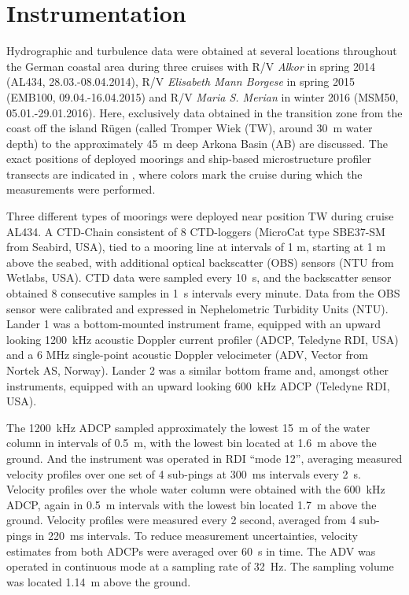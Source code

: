 \section{Instrumentation}

Hydrographic and turbulence data were obtained at several locations throughout 
the 
German coastal area during three cruises with R/V \textit{Alkor} in spring 2014 
(AL434, 28.03.-08.04.2014), R/V \textit{Elisabeth Mann Borgese} in spring 2015 
(EMB100, 09.04.-16.04.2015) and R/V \textit{Maria S. Merian} in winter 2016 
(MSM50, 05.01.-29.01.2016). Here, exclusively data obtained in the 
transition zone from the coast off 
the island R\"{u}gen (called Tromper Wiek (TW), around 30~m water depth) to 
the approximately 45~m deep Arkona Basin (AB) are discussed. The exact 
positions of deployed 
moorings and ship-based microstructure profiler transects are indicated in 
, where colors mark the cruise during which the measurements 
were performed.

Three different types of moorings were deployed near position TW during cruise 
AL434. A CTD-Chain consistent of 8 CTD-loggers (MicroCat type SBE37-SM from 
Seabird, USA), tied to a mooring line at intervals of 1 m, starting at 1 m above 
the seabed, with additional optical backscatter (OBS) sensors (NTU from 
Wetlabs, USA). CTD data were sampled every 10~s, and the backscatter sensor 
obtained 8 consecutive samples in 1~s intervals every minute. Data from the OBS 
sensor were calibrated and expressed in Nephelometric Turbidity Units (NTU).
Lander 1 was a bottom-mounted instrument frame, equipped with an upward looking 
1200~kHz acoustic Doppler current profiler (ADCP, Teledyne RDI, USA) and a 6 
MHz single-point acoustic Doppler velocimeter (ADV, Vector from Nortek AS, 
Norway).
Lander 2 was a similar bottom frame and, amongst other instruments, equipped 
with an upward looking 600~kHz ADCP (Teledyne RDI, USA).

The 1200~kHz ADCP sampled approximately the lowest 15~m of the water column in 
intervals of 0.5~m, with the lowest bin located at 1.6~m above the ground. 
And the instrument was operated in RDI ``mode 12'', 
averaging measured velocity profiles over one set of 4 sub-pings at 300~ms 
intervals every 2~s. 
Velocity profiles over the whole water column were 
obtained with the 600~kHz ADCP, again in 0.5~m intervals with the lowest bin 
located 1.7~m above the ground. Velocity profiles were measured every 2 second, 
averaged from 4 sub-pings in 220~ms intervals. To reduce measurement 
uncertainties, velocity estimates from both ADCPs were averaged over 60~s in 
time. 
The ADV was operated in continuous mode at a sampling rate of 32~Hz. The 
sampling volume was located 1.14~m above the ground.

